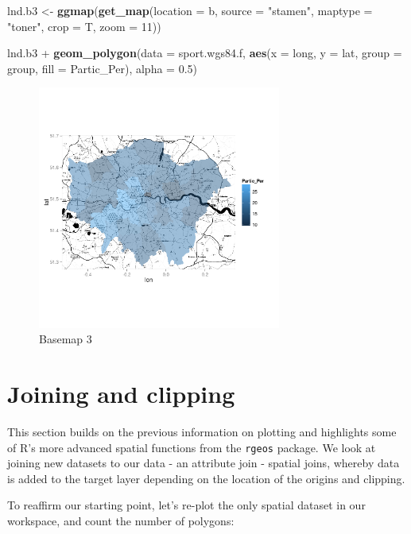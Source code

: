 \documentclass[]{article}
\newenvironment{Shaded}{}{}
\newcommand{\KeywordTok}[1]{\textcolor[rgb]{0.00,0.44,0.13}{\textbf{{#1}}}}
\newcommand{\DataTypeTok}[1]{\textcolor[rgb]{0.56,0.13,0.00}{{#1}}}
\newcommand{\DecValTok}[1]{\textcolor[rgb]{0.25,0.63,0.44}{{#1}}}
\newcommand{\FloatTok}[1]{\textcolor[rgb]{0.25,0.63,0.44}{{#1}}}
\newcommand{\StringTok}[1]{\textcolor[rgb]{0.25,0.44,0.63}{{#1}}}
\newcommand{\NormalTok}[1]{{#1}}
\begin{document}
\begin{Shaded}
\begin{Highlighting}[]
\NormalTok{lnd.b3 <- }\KeywordTok{ggmap}\NormalTok{(}\KeywordTok{get_map}\NormalTok{(}\DataTypeTok{location =} \NormalTok{b, }\DataTypeTok{source =} \StringTok{"stamen"}\NormalTok{, }\DataTypeTok{maptype =} \StringTok{"toner"}\NormalTok{, }
    \DataTypeTok{crop =} \NormalTok{T, }\DataTypeTok{zoom =} \DecValTok{11}\NormalTok{))}

\NormalTok{lnd.b3 + }\KeywordTok{geom_polygon}\NormalTok{(}\DataTypeTok{data =} \NormalTok{sport.wgs84.f, }\KeywordTok{aes}\NormalTok{(}\DataTypeTok{x =} \NormalTok{long, }\DataTypeTok{y =} \NormalTok{lat, }\DataTypeTok{group =} \NormalTok{group, }
    \DataTypeTok{fill =} \NormalTok{Partic_Per), }\DataTypeTok{alpha =} \FloatTok{0.5}\NormalTok{)}
\end{Highlighting}
\end{Shaded}
\begin{figure}[htbp]
\centering
\includegraphics[width=8cm]{figure/Basemap_3.png}
\caption{Basemap 3}
\end{figure}

\section{Joining and clipping}

This section builds on the previous information on plotting and
highlights some of R's more advanced spatial functions from the
\texttt{rgeos} package. We look at joining new datasets to our data - an
attribute join - spatial joins, whereby data is added to the target
layer depending on the location of the origins and clipping.

To reaffirm our starting point, let's re-plot the only spatial dataset
in our workspace, and count the number of polygons:
\end{document}
